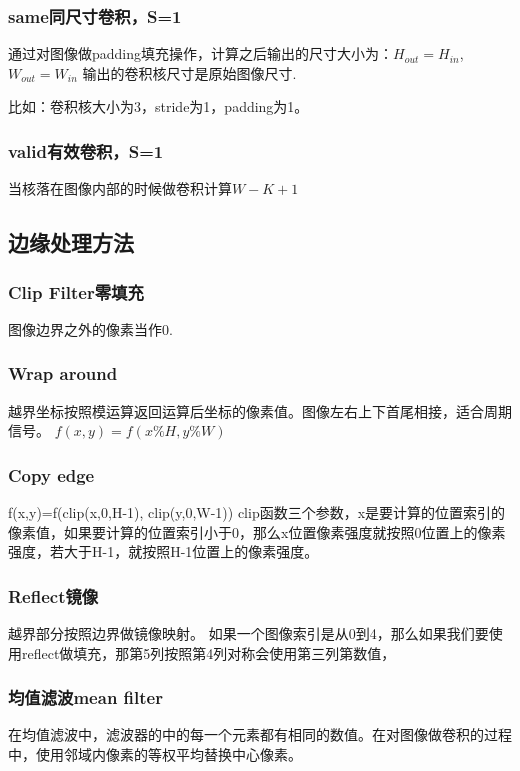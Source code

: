 \documentclass[UTF8]{ctexart}
\begin{document}
\subsubsection{same同尺寸卷积，S=1}
通过对图像做padding填充操作，计算之后输出的尺寸大小为：$H_{out}=H_{in}$,$W_{out}=W_{in}$
输出的卷积核尺寸是原始图像尺寸.

比如：卷积核大小为3，stride为1，padding为1。

\subsubsection{valid有效卷积，S=1}
当核落在图像内部的时候做卷积计算$W-K+1$

\subsection{边缘处理方法}

\subsubsection{Clip Filter零填充}
图像边界之外的像素当作0.

\subsubsection{Wrap around}
越界坐标按照模运算返回运算后坐标的像素值。图像左右上下首尾相接，适合周期信号。
$f(x,y)=f(x\%H,y\%W)$

\subsubsection{Copy edge}

f(x,y)=f(clip(x,0,H-1), clip(y,0,W-1))
clip函数三个参数，x是要计算的位置索引的像素值，如果要计算的位置索引小于0，那么x位置像素强度就按照0位置上的像素强度，若大于H-1，就按照H-1位置上的像素强度。

\subsubsection{Reflect镜像}
越界部分按照边界做镜像映射。
如果一个图像索引是从0到4，那么如果我们要使用reflect做填充，那第5列按照第4列对称会使用第三列第数值，

\subsubsection{均值滤波mean filter}
在均值滤波中，滤波器的中的每一个元素都有相同的数值。在对图像做卷积的过程中，使用邻域内像素的等权平均替换中心像素。
\end{document}
